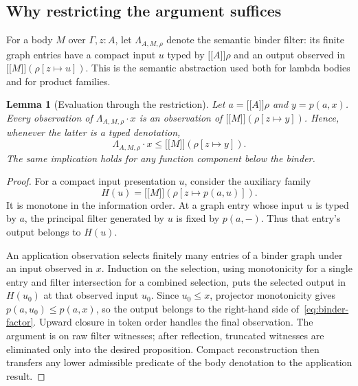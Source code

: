 \documentclass[11pt,a4paper]{article}
\newtheorem{lemma}[theorem]{Lemma}
\theoremstyle{definition}
\theoremstyle{remark}
\newcommand{\ev}[1]{\mathopen{[\![}#1\mathclose{]\!]}}
\newcommand{\appl}{\mathbin{\cdot}}
\begin{document}
\subsection{Why restricting the argument suffices}

For a body $M$ over $\Gamma,z:A$, let $\Lambda_{A,M,\rho}$ denote the
semantic binder filter: its finite graph entries have a compact input
$u$ typed by $\ev A\rho$ and an output observed in
$\ev M(\rho[z\mapsto u])$. This is the semantic abstraction used both
for lambda bodies and for product families.

\begin{lemma}[Evaluation through the restriction]\label{lem:binder-factor}
Let $a=\ev A\rho$ and $y=p(a,x)$. Every observation of
$\Lambda_{A,M,\rho}\appl x$ is an observation of
$\ev M(\rho[z\mapsto y])$. Hence, whenever the latter is a typed
denotation,
\begin{equation}\label{eq:binder-factor}
 \Lambda_{A,M,\rho}\appl x\leq\ev M(\rho[z\mapsto y]).
\end{equation}
The same implication holds for any function component below the binder.
\end{lemma}
\begin{proof}
For a compact input presentation $u$, consider the auxiliary family
\[
 H(u)=\ev M(\rho[z\mapsto p(a,u)]).
\]
It is monotone in the information order. At a graph entry whose input
$u$ is typed by $a$, the principal filter generated by $u$ is fixed by
$p(a,-)$. Thus that entry's output belongs to $H(u)$.

An application observation selects finitely many entries of a binder
graph under an input observed in $x$. Induction on the selection,
using monotonicity for a single entry and filter intersection for a
combined selection, puts the selected output in $H(u_0)$ at that
observed input $u_0$. Since $u_0\leq x$, projector monotonicity gives
$p(a,u_0)\leq p(a,x)$, so the output belongs to the right-hand side
of~\eqref{eq:binder-factor}. Upward closure in token order handles the
final observation. The argument is on raw filter witnesses; after
reflection, truncated witnesses are eliminated only into the desired
proposition. Compact reconstruction then transfers any lower admissible
predicate of the body denotation to the application result.
\end{proof}
\end{document}
